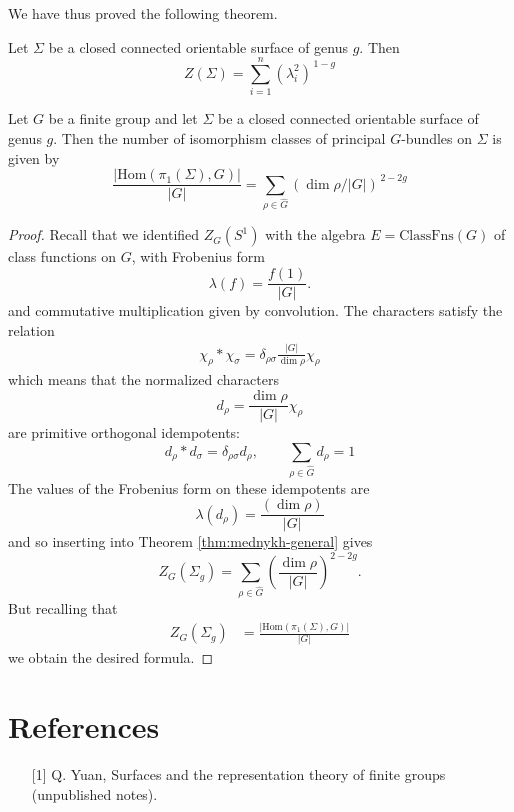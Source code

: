 \documentclass[12pt]{article}
\begin{document}
We have thus proved the following theorem.
\begin{theorem}\label{thm:mednykh-general}
Let $\Sigma$ be a closed connected orientable surface of genus $g$. Then
\[
Z(\Sigma)=\sum_{i=1}^n (\lambda_i^2)^{\,1-g}
\]
\end{theorem}

\begin{corollary}
Let $G$ be a finite group and let $\Sigma$ be a closed connected orientable surface of genus $g$. Then the number of isomorphism classes of principal $G$-bundles on $\Sigma$ is given by
\[
\frac{|\mathrm{Hom}(\pi_1(\Sigma),G)|}{|G|}=\sum_{\rho\in \hat{G}} (\dim \rho/|G|)^{\,2-2g}
\]
\end{corollary}

\begin{proof}
    Recall that we identified $Z_G(S^1)$ with the algebra $E = \mathrm{ClassFns}(G)$ of class functions on $G$, with Frobenius form
    \[\lambda(f) = \frac{f(1)}{|G|}.\]
and commutative multiplication given by convolution. The characters satisfy the relation 
\begin{align*}
    \chi_\rho * \chi_\sigma = \delta_{\rho\sigma} \frac{|G|}{\dim \rho} \chi_\rho
\end{align*}
which means that the normalized characters
\[d_\rho = \frac{\dim \rho}{|G|} \chi_\rho\]
are primitive orthogonal idempotents:
\[d_\rho * d_\sigma = \delta_{\rho\sigma} d_\rho,\qquad \sum_{\rho\in \hat{G}} d_\rho = 1\]
The values of the Frobenius form on these idempotents are
\[\lambda(d_\rho) = \frac{(\dim \rho)}{|G|}\]
and so inserting into Theorem \ref{thm:mednykh-general} gives
\[Z_G(\Sigma_g) = \sum_{\rho\in \hat{G}} \left(\frac{\dim \rho}{|G|}\right)^{2-2g}.\]
But recalling that \begin{align*}
    Z_G(\Sigma_g) & = \frac{|\mathrm{Hom}(\pi_1(\Sigma),G)|}{|G|}
\end{align*} we obtain the desired formula.
\end{proof}

\section{References}
\begin{enumerate}
\item[{[1]}] Q. Yuan, Surfaces and the representation theory of finite groups (unpublished notes).

\end{enumerate}
\end{document}
